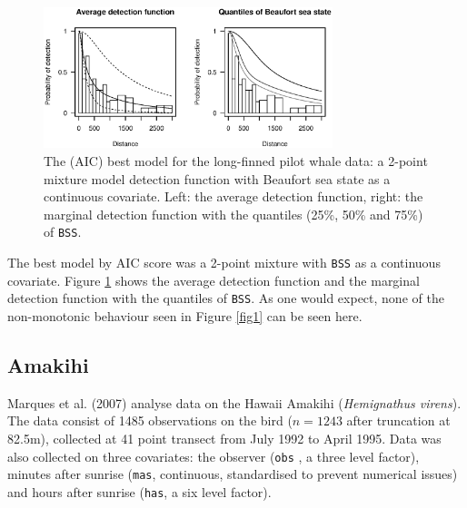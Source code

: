 \documentclass[useAMS,referee, usegraphicx]{biom}
\begin{document}
\begin{figure}
\centering
\includegraphics[width=0.75\textwidth]{analyses/danpike-bssc.eps}
\caption{The (AIC) best model for the long-finned pilot whale data: a 2-point mixture model detection function with Beaufort sea state as a continuous covariate. Left: the average detection function, right: the marginal detection function with the quantiles (25\%, 50\% and 75\%) of \texttt{BSS}.}
\label{danpike-detfct}
\end{figure}



The best model by AIC score was a 2-point mixture with \texttt{BSS} as a continuous covariate. Figure \ref{danpike-detfct} shows the average detection function and the marginal detection function with the quantiles of \texttt{BSS}. As one would expect, none of the non-monotonic behaviour seen in Figure \ref{fig1} can be seen here.

\subsection{Amakihi}
Marques et al. (2007) analyse data on the Hawaii Amakihi (\textit{Hemignathus virens}). The data consist of 1485 observations on the bird ($n=1243$ after truncation at 82.5m), collected at 41 point transect from July 1992 to April 1995. Data was also collected on three covariates: the observer (\texttt{obs} , a three level factor), minutes after sunrise (\texttt{mas}, continuous, standardised to prevent numerical issues) and hours after sunrise (\texttt{has}, a six level factor).
\end{document}
